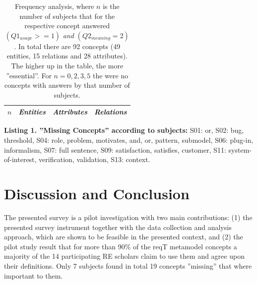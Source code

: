 \documentclass[a4paper]{llncs}
\begin{document}
\vspace{-3em}
\begingroup
\setlength{\tabcolsep}{4pt} %
\renewcommand{\arraystretch}{1.35} %
\begin{table}
\begin{center}
\fontsize{7}{8}\selectfont
\caption{Frequency analysis, where $n$ is the number of subjects that for the respective concept answered $(Q1_{usage}>= 1)$ \textit{and} $(Q2_{meaning} = 2)$. In total there are 92 concepts (49 entities, 15 relations and 28 attributes). The higher up in the table, the more ''essential''. For $n = 0, 2, 3, 5$ the were no concepts with answers by that number of subjects.}
\label{table:frequency}
\begin{tabular}{l | p{} | p{} | p{}}
\textit{$n$} & \textit{Entities} & \textit{Attributes} & \textit{Relations} \\ \hline

\end{tabular}
\end{center}

\vspace{0.1cm}
\fontsize{9}{10}\selectfont 
\textbf{Listing 1. ''Missing Concepts'' according to subjects:}
S01: or, 
S02: bug, threshold,
S04: role, problem, motivates, and, or, pattern, submodel,
S06: plug-in, informalism, 
S07: full sentence, 
S09: satisfaction, satisfies, customer,
S11: system-of-interest, verification, validation, S13: context. 
\end{table}
\endgroup





\section{Discussion and Conclusion}\label{section:discussion}

The presented survey is a pilot investigation with two main contributions: (1) the presented survey instrument together with the data collection and analysis approach, which are shown to be feasible in the presented context, and (2) the pilot study result that for more than 90\% of the reqT metamodel concepts a majority of the 14 participating RE scholars claim to use them and agree upon their definitions. Only 7 subjects found in total 19 concepts ''missing'' that where important to them. 
\end{document}
